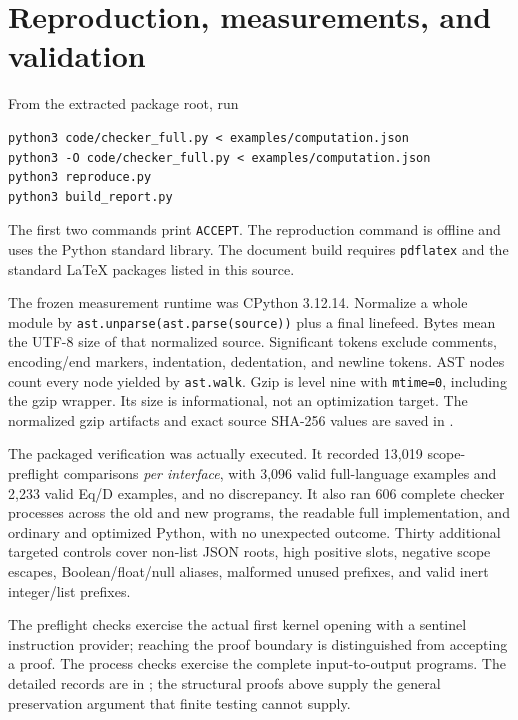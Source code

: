 \documentclass[11pt]{article}
\theoremstyle{definition}\newtheorem{definition}[theorem]{Definition}
\theoremstyle{remark}\newtheorem{remark}[theorem]{Remark}
\begin{document}
\section{Reproduction, measurements, and validation}

From the extracted package root, run
\begin{lstlisting}
python3 code/checker_full.py < examples/computation.json
python3 -O code/checker_full.py < examples/computation.json
python3 reproduce.py
python3 build_report.py
\end{lstlisting}
The first two commands print \texttt{ACCEPT}. The reproduction command is
offline and uses the Python standard library. The document build requires
\texttt{pdflatex} and the standard LaTeX packages listed in this source.

The frozen measurement runtime was CPython 3.12.14. Normalize a whole
module by \texttt{ast.unparse(ast.parse(source))} plus a final linefeed.
Bytes mean the UTF-8 size of that normalized source. Significant tokens
exclude comments, encoding/end markers, indentation, dedentation, and
newline tokens. AST nodes count every node yielded by
\texttt{ast.walk}. Gzip is level nine with \texttt{mtime=0}, including
the gzip wrapper. Its size is informational, not an optimization target.
The normalized gzip artifacts and exact source SHA-256 values are saved
in .

The packaged verification was actually executed. It recorded 13,019
scope-preflight comparisons \emph{per interface}, with 3,096 valid
full-language examples and 2,233 valid Eq/D examples, and no discrepancy.
It also ran 606 complete checker processes across the old and new
programs, the readable full implementation, and ordinary and optimized
Python, with no unexpected outcome. Thirty additional targeted controls
cover non-list JSON roots, high positive slots, negative scope escapes,
Boolean/float/null aliases, malformed unused prefixes, and valid inert
integer/list prefixes.

The preflight checks exercise the actual first kernel opening with a
sentinel instruction provider; reaching the proof boundary is
distinguished from accepting a proof. The process checks exercise the
complete input-to-output programs. The detailed records are in
; the structural proofs above supply the
general preservation argument that finite testing cannot supply.



\end{document}
